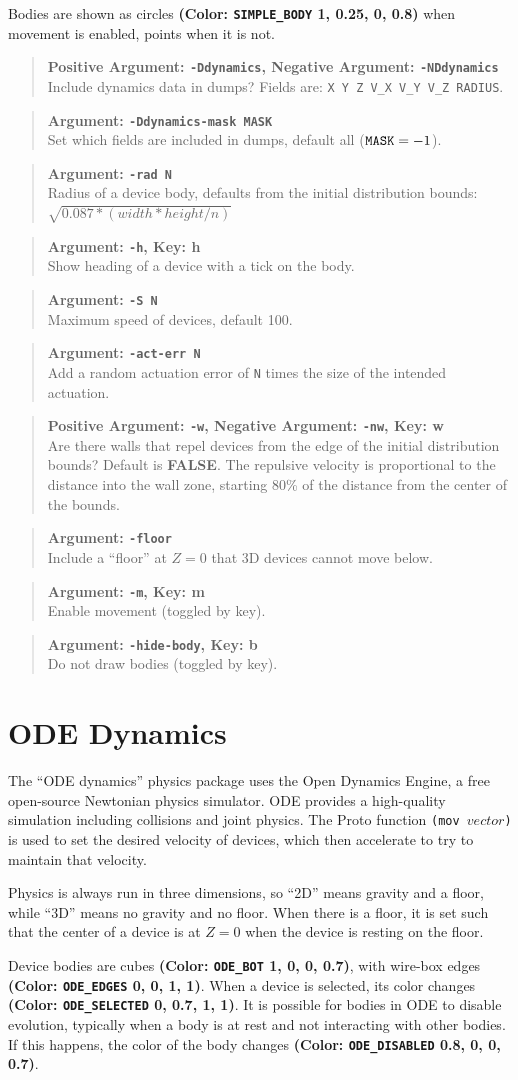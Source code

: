 \documentclass{article}
\newcommand\false{{\bf FALSE}}
\newcommand\var[1]{{\tt #1}}
\newcommand\key[1]{{\bf #1}}
\newcommand\simarg[2]{\begin{quote} {\bf Argument: \var{#1}} \\ #2 \end{quote}}
\newcommand\simargkey[3]{
  \begin{quote} {\bf Argument: \var{#1}, Key: \key{#2}} \\ #3 \end{quote}
}
\newcommand\simPMarg[3]{
  \begin{quote}
    {\bf Positive Argument: \var{#1}, Negative Argument: \var{#2}} \\ #3
  \end{quote}
}
\newcommand\simPMargkey[4]{
  \begin{quote}
    {\bf Positive Argument: \var{#1}, Negative Argument: \var{#2}, 
      Key: \key{#3}} \\ #4
  \end{quote}
}
\newcommand\color[5]{{\bf (Color: {\tt #1} #2, #3, #4, #5)}} %
\begin{document}
Bodies are shown as circles \color{SIMPLE\_BODY}{1}{0.25}{0}{0.8} when
movement is enabled, points when it is not.

\simPMarg{-Ddynamics}{-NDdynamics}{Include dynamics data in dumps?
  Fields are: \var{X Y Z V\_X V\_Y V\_Z RADIUS}.}
\simarg{-Ddynamics-mask MASK}{Set which fields are included in 
  dumps, default all ($\var{MASK}=-1$).}

\simarg{-rad N}{Radius of a device body, defaults from the initial
  distribution bounds: $\sqrt{0.087*(width*height/n)}$}
\simargkey{-h}{h}{Show heading of a device with a tick on the body.}
\simarg{-S N}{Maximum speed of devices, default 100.}
\simarg{-act-err N}{Add a random actuation error of \var{N} times the
  size of the intended actuation.}
\simPMargkey{-w}{-nw}{w}{Are there walls that repel devices from the
  edge of the initial distribution bounds?  Default is \false{}. The
  repulsive velocity is proportional to the distance into the wall
  zone, starting 80\% of the distance from the center of the bounds.}
\simarg{-floor}{Include a ``floor'' at $Z=0$ that 3D devices cannot
  move below.}
\simargkey{-m}{m}{Enable movement (toggled by key).}
\simargkey{-hide-body}{b}{Do not draw bodies (toggled by key).}


\section{ODE Dynamics}

The ``ODE dynamics'' physics package uses the Open Dynamics
Engine\cite{ode}, a free open-source Newtonian physics simulator.  ODE
provides a high-quality simulation including collisions and joint
physics.  The Proto function \var{(mov $vector$)} is used to set the
desired velocity of devices, which then accelerate to try to maintain
that velocity.

Physics is always run in three dimensions, so ``2D'' means gravity and
a floor, while ``3D'' means no gravity and no floor.  When there is a
floor, it is set such that the center of a device is at $Z=0$ when the
device is resting on the floor.

Device bodies are cubes \color{ODE\_BOT}{1}{0}{0}{0.7}, with wire-box
edges \color{ODE\_EDGES}{0}{0}{1}{1}.  When a device is selected, its
color changes \color{ODE\_SELECTED}{0}{0.7}{1}{1}.  It is possible for
bodies in ODE to disable evolution, typically when a body is at rest
and not interacting with other bodies.  If this happens, the color of
the body changes \color{ODE\_DISABLED}{0.8}{0}{0}{0.7}.
\end{document}

